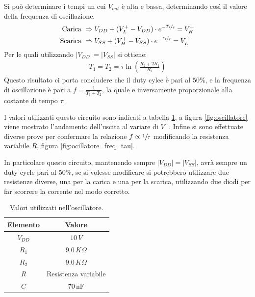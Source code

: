 \documentclass[a4paper,12pt]{article}
\begin{document}
Si può determinare i tempi un cui $V_{out}$ è alta e bassa, determinando così il valore della frequenza di oscillazione.
\begin{align*}
    \text{Carica}\,\, &\Rightarrow V_{DD} + (V^+_L - V_{DD}) \cdot e^{-\sfrac{T_1}{\tau}} = V^+_H\\
    \text{Scarica}\,\, &\Rightarrow V_{SS} + (V^+_H - V_{SS}) \cdot e^{-\sfrac{T_2}{\tau}} = V^+_L
\end{align*}
    Per le quali utilizzando $\left| V_{DD} \right| = \left| V_{SS} \right|$ si ottiene:
\begin{align*}
        T_1 = T_2 = \tau \ln\left( \frac{R_2 + 2R_1}{R_2} \right) 
\end{align*}
Questo risultato ci porta concludere che il duty cylce è pari al $50\%$, e la frequenza di oscillazione è pari a $ f = \frac{1}{T_1 + T_2}$, la quale e inversamente proporzionale alla costante di tempo $\tau$.

\noindent I valori utilizzati questo circuito sono indicati a tabella \ref{tab:oscillatore}, a figura \ref{fig:oscillatore} viene mostrato l'andamento dell'uscita al variare di $V^-$. Infine si sono effettuate diverse prove per confermare la relazione $f \propto \sfrac{1}{\tau}$ modificando la resistenza variabile $R$, figura \ref{fig:ocillatore_freq_tau}.

\noindent In particolare questo circuito, mantenendo sempre $\left| V_{DD} \right| = \left| V_{SS} \right|$, avrà sempre un duty cycle pari al $50\%$, se si volesse modificare si potrebbero utilizzare due resistenze diverse, una per la carica e una per la scarica, utilizzando due diodi per far scorrere la corrente nel modo corretto. 
\begin{table}[h]
	\centering
	\setlength{\tabcolsep}{20pt}
	\begin{tabular}{c c}
		\toprule
		Elemento & Valore             \\
		\midrule
		$V_{DD}$ & $10\,V$            \\
		$R_1$    & $9.0\,K\Omega$     \\
		$R_2$    & $9.0\,K\Omega$     \\
		$R$    & Resistenza variabile    \\
		$C$      & $70\,\mathrm{nF}$  \\
		\bottomrule
	\end{tabular}
	\caption{Valori utilizzati nell'oscillatore.}
	\label{tab:oscillatore}
\end{table}
\end{document}
